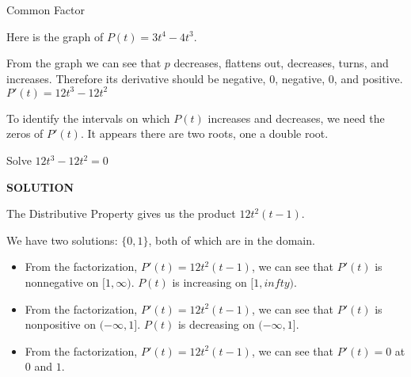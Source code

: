 \documentclass{ximera}
\begin{document}
\begin{example}  Common Factor


Here is the graph of $P(t) = 3 t^4 - 4 t^3$.



\begin{center}
\end{center}


From the graph we can see that $p$ decreases, flattens out, decreases, turns, and increases.  Therefore its derivative should be negative, $0$, negative, $0$, and positive. \\



$P'(t) = 12 t^3 - 12 t^2$ \\




\begin{center}
\end{center}



To identify the intervals on which $P(t)$ increases and decreases, we need the zeros of $P'(t)$.  It appears there are two roots, one a double root.






Solve $12 t^3 - 12 t^2 = 0$



\textbf{\textcolor{purple!50!blue!90!black}{SOLUTION}}


The Distributive Property gives us the product $12 t^2 (t-1)$.




We have two solutions: $\{ 0, 1  \}$, both of which are in the domain.




\begin{itemize}
\item From the factorization, $P'(t) = 12 t^2 (t-1)$, we can see that $P'(t)$ is nonnegative on $[1, \infty)$. $P(t)$ is increasing on $[1, infty)$. \\
\item From the factorization, $P'(t) = 12 t^2 (t-1)$, we can see that $P'(t)$ is nonpositive on $(-\infty, 1]$. $P(t)$ is decreasing on $(-\infty, 1]$. \\
\item From the factorization, $P'(t) = 12 t^2 (t-1)$, we can see that $P'(t) = 0$ at $0$ and $1$.
\end{itemize}






\end{example}
\end{document}
